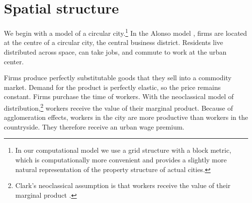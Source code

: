 \section{Spatial structure}

%  

We begin with a model of a circular city.\footnote{In our computational model we use a grid structure with  a block metric, which is computationally more convenient and provides a slightly more natural representation of the property structure of actual cities.} %
In the \gls{Alonso model} \cite{alonsoTheoryUrbanLand1960, alonsoLocationLandUse1964}, firms are located at the centre of a circular city, the central business district. Residents live distributed across space, can take jobs, and commute to work at the urban center. 



Firms produce perfectly \gls{substitutable} %
goods that they sell into a commodity market. Demand for the \gls{product} is \gls{perfectly elastic}, so the price remains constant. 
Firms purchase the time of workers. %
With the neoclassical model of distribution,\footnote{Clark's neoclassical assumption is that workers receive the value of their marginal product \cite{clarkDistributionWealthTheory1899}.} 
workers receive the value of their marginal product. 
Because of agglomeration effects, workers in the city are more productive than workers in the countryside. They therefore receive an \gls{urban wage premium}.

